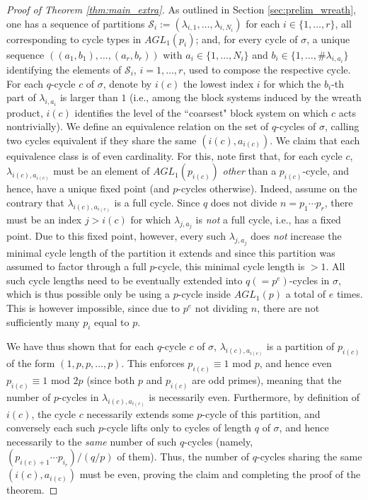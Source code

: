 \documentclass[a4paper]{amsart}
\begin{document}
\begin{proof}[Proof of Theorem \ref{thm:main_extra}]
  As outlined in Section \ref{sec:prelim_wreath}, one has a sequence of partitions $\mathcal{S}_i:=(\lambda_{i,1},\dots, \lambda_{i,N_i})$ for each $i\in \{1,\dots, r\}$, all corresponding to cycle types in $AGL_1(p_i)$; and, for every cycle of $\sigma$, a unique sequence  $((a_1,b_1),\dots, (a_r,b_r))$ with $a_i\in \{1,\dots, N_i\}$ and $b_i\in \{1,\dots, \#\lambda_{i,a_i}\}$  identifying the elements of $\mathcal{S}_i$, $i=1,\dots, r$, used to compose the respective cycle. For each $q$-cycle $c$ of $\sigma$, denote by $i(c)$ the lowest index $i$ for which the $b_i$-th part of $\lambda_{i,a_i}$ is larger than $1$ (i.e., among the block systems induced by the wreath product, $i(c)$ identifies the level of the ``coarsest" block system on which $c$ acts nontrivially). We define an equivalence relation on the set of $q$-cycles of $\sigma$, calling two cycles equivalent if they share the same $(i(c), a_{i(c)})$. We claim that each equivalence class is of even cardinality. For this, note first that, for each cycle $c$, $\lambda_{i(c), a_{i(c)}}$ must be an element of $AGL_1(p_{i(c)})$ {\it other} than a $p_{i(c)}$-cycle, and hence, have a unique fixed point (and $p$-cycles otherwise). Indeed, assume on the contrary that $\lambda_{i(c),a_{i(c)}}$ is a full cycle. Since $q$ does not divide $n=p_1\cdots p_r$, there must be an index $j>i(c)$ for which $\lambda_{j,a_j}$ is {\it not} a full cycle, i.e., has a fixed point. Due to this fixed point, however, every such $\lambda_{j,a_j}$ does {\it not} increase the minimal cycle length of the partition it extends and since this partition was assumed to factor through a full $p$-cycle, this minimal cycle length is $>1$. All such cycle lengths need to be eventually extended into $q(=p^e)$-cycles in $\sigma$, which is thus possible only be using a $p$-cycle inside $AGL_1(p)$ a total of $e$ times. This is however impossible, since due to $p^e$ not dividing $n$, there are not sufficiently many $p_i$ equal to $p$.
   
  We have thus shown that for each $q$-cycle $c$ of $\sigma$, $\lambda_{i(c),a_{i(c)}}$ is a partition of $p_{i(c)}$ of the form $(1,p,p,\dots, p)$. This enforces $p_{i(c)}\equiv 1$ mod $p$, and hence even $p_{i(c)}\equiv 1$ mod $2p$ (since both $p$ and $p_{i(c)}$ are odd primes), meaning that the number of $p$-cycles in $\lambda_{i(c), a_{i(c)}}$ is necessarily even. Furthermore, by definition of $i(c)$, the cycle $c$ necessarily extends some $p$-cycle of this partition, and conversely each such $p$-cycle
   lifts only to cycles of length $q$ of $\sigma$, and hence necessarily to the {\it same} number of such $q$-cycles 
  (namely, $(p_{i(c)+1}\cdots p_{i_r})/(q/p)$ of them). Thus, the number of $q$-cycles sharing the same $(i(c), a_{i(c)})$ must be even, proving the claim and completing the proof of the theorem.
  \end{proof}
  
\end{document}

